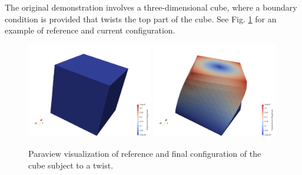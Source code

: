 \documentclass[12pt,3p]{article}
\begin{document}
The original demonstration involves a three-dimensional cube, where a boundary condition is provided that twists the top part of the cube. See Fig. \ref{FigVisual} for an example of reference and current configuration.
\begin{figure}[!htb]
\centering
\includegraphics[width=0.49\textwidth]{./Images/MixedForm/Disp_00}
\includegraphics[width=0.49\textwidth]{./Images/MixedForm/Disp_19}
\caption{Paraview visualization of reference and final configuration of the cube subject to a twist.}
\label{FigVisual}
\end{figure}

\end{document}
